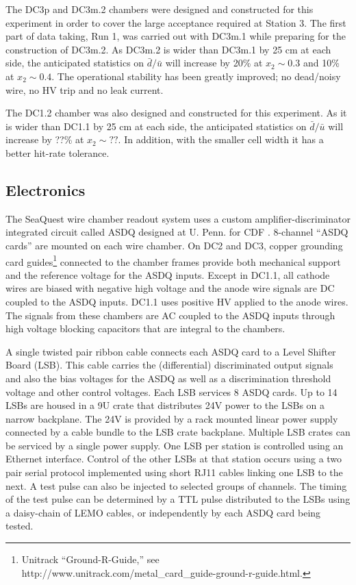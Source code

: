 The DC3p and DC3m.2 chambers were designed and constructed for this experiment
in order to cover the large acceptance required at Station 3.
The first part of data taking, Run 1, was carried out with DC3m.1
while preparing for the construction of DC3m.2.
As DC3m.2 is wider than DC3m.1 by 25 cm at each side,
the anticipated statistics on $\bar{d}/\bar{u}$ will increase
by 20\% at $x_2 \sim 0.3$ and 10\% at $x_2 \sim 0.4$.
The operational stability has been greatly improved;
no dead/noisy wire, no HV trip and no leak current.

The DC1.2 chamber was also designed and constructed for this experiment.
As it is wider than DC1.1 by 25 cm at each side,
the anticipated statistics on $\bar{d}/\bar{u}$ will increase
by ??\% at $x_2 \sim ??$.
In addition, with the smaller cell width it has a better hit-rate tolerance.

%
\subsection{Electronics}

The SeaQuest wire chamber readout system uses a custom amplifier-discriminator integrated circuit called ASDQ designed at U. Penn. for CDF \cite{ASDQ}.  8-channel ``ASDQ cards'' are mounted on each wire chamber.  On DC2 and DC3, copper grounding card guides\footnote{Unitrack ``Ground-R-Guide,'' see http://www.unitrack.com/metal\_card\_guide-ground-r-guide.html.} connected to the chamber frames provide both mechanical support and the reference voltage for the ASDQ inputs.  Except in DC1.1, all cathode wires are biased with negative high voltage and the anode wire signals are DC coupled to the ASDQ inputs.  DC1.1 uses positive HV applied to the anode wires.  The signals from these chambers are AC coupled to the ASDQ inputs through high voltage blocking capacitors that are integral to the chambers.

A single twisted pair ribbon cable connects each ASDQ card to a Level Shifter Board (LSB).  This cable carries the (differential) discriminated output signals and also the bias voltages for the ASDQ as well as a discrimination threshold voltage and other control voltages.  Each LSB services 8 ASDQ cards.  Up to 14 LSBs are housed in a 9U crate that distributes 24V power to the LSBs on a narrow backplane.  The 24V is provided by a rack mounted linear power supply connected by a cable bundle to the LSB crate backplane.  Multiple LSB crates can be serviced by a single power supply.  One LSB per station is controlled using an Ethernet interface.  Control of the other LSBs at that station occurs using a two pair serial protocol implemented using short RJ11 cables linking one LSB to the next.  A test pulse can also be injected to selected groups of channels.  The timing of the test pulse can be determined by a TTL pulse distributed to the LSBs using a daisy-chain of LEMO cables, or independently by each ASDQ card being tested.

